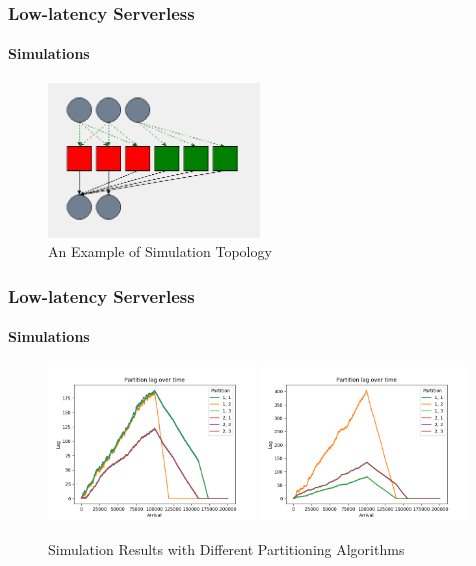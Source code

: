 \documentclass[aspectratio=169]{beamer}
\begin{document}
\begin{frame}
	\frametitle{Low-latency Serverless}
	\framesubtitle{Simulations}

	\begin{figure}[h]
		\centering
		\includegraphics[width=0.5\textwidth]{diffservices-topology}
		\caption{An Example of Simulation Topology}
	\end{figure}
\end{frame}

\begin{frame}
	\frametitle{Low-latency Serverless}
	\framesubtitle{Simulations}

	\begin{figure}[h]
		\centering
		\includegraphics[width=0.49\textwidth]{diffservices-lyapunov}
		\includegraphics[width=0.49\textwidth]{diffservices-optimal}
		\caption{Simulation Results with Different Partitioning Algorithms}
	\end{figure}
\end{frame}
\end{document}
